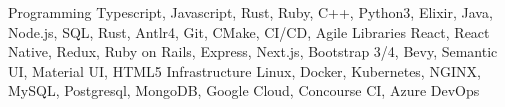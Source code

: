 \begin{cvskills}
  \cvskill
    {Programming}
    {Typescript, Javascript, Rust, Ruby, C++, Python3, Elixir, Java, Node.js, SQL, Rust, Antlr4, Git, CMake, CI/CD, Agile}
  \cvskill
    {Libraries}
    {React, React Native, Redux, Ruby on Rails, Express, Next.js, Bootstrap 3/4, Bevy, Semantic UI, Material UI, HTML5}
  \cvskill
    {Infrastructure}
    {Linux, Docker, Kubernetes, NGINX, MySQL, Postgresql, MongoDB, Google Cloud, Concourse CI, Azure DevOps}
\end{cvskills}
